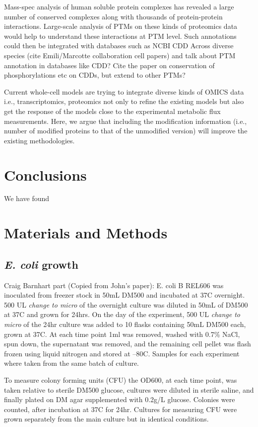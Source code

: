 \documentclass[12pt]{article}
\begin{document}
Mass-spec analysis of human soluble protein complexes has revealed a large number of conserved complexes along with thousands of protein-protein interactions. Large-scale analysis of PTMs on these kinds of proteomics data would help to understand these interactions at PTM level. Such annotations could then be integrated with databases such as NCBI CDD
Across diverse species (cite Emili/Marcotte collaboration cell papers) and talk about PTM annotation in databases like CDD? Cite the paper on conservation of phosphorylations etc on CDDs, but extend to other PTMs?

Current whole-cell models \cite{Covertetal2008} are trying to integrate diverse kinds of OMICS data i.e., transcriptomics, proteomics not only to refine the existing models but also get the response of the models close to the experimental metabolic flux measurements. Here, we argue that including the modification information (i.e., number of modified proteins to that of the unmodified version) will improve the existing methodologies.



\section{Conclusions}

We have found


\section{Materials and Methods}

\subsection{\emph{E. coli} growth} 
Craig Barnhart part (Copied from John’s paper):
E. coli B REL606 was inoculated from freezer stock in 50mL DM500 and incubated at 37C overnight. 500 UL \emph{change to micro} of the overnight culture was diluted in 50mL of DM500 at 37C and grown for 24hrs. On the day of the experiment, 500 UL \emph{change to micro} of the 24hr culture was added to 10 flasks containing 50mL DM500 each, grown at 37C. At each time point 1ml was removed, washed with 0.7\% NaCl, spun down, the supernatant was removed, and the remaining cell pellet was flash frozen using liquid nitrogen and stored at –80C. Samples for each experiment where taken from the same batch of culture. 

To measure colony forming units (CFU) the OD600, at each time point, was taken relative to sterile DM500 glucose, cultures were diluted in sterile saline, and finally plated on DM agar supplemented with 0.2g/L glucose. Colonies were counted, after incubation at 37C for 24hr. Cultures for measuring CFU were grown separately from the main culture but in identical conditions. 
\end{document}

